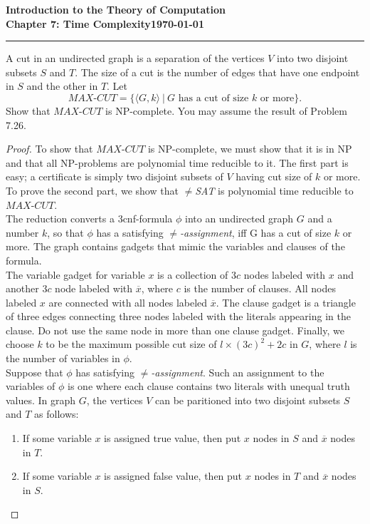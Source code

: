 \documentclass[11pt]{article}
\newcommand{\dated}{\today}
\begin{document}
\textbf{Introduction to the Theory of
Computation}\hfill\textbf{\myname}\\[0.01in]
\textbf{Chapter 7: Time Complexity}\hfill\textbf{\dated}\\
\smallskip\hrule\bigskip

\begin{problem}{7.27}
A cut in an undirected graph is a separation of the vertices $V$ into two disjoint
subsets $S$ and $T$. The size of a cut is the number of edges that have one endpoint
in $S$ and the other in $T$. Let
\[
MAX\text{-}CUT = \{\langle G, k \rangle \ | \ G \text{ has a cut of size } k \text{ or more}\}.
\]
Show that $MAX\text{-}CUT$ is NP-complete. You may assume the result of Problem 7.26.
\end{problem}

\begin{proof}
To show that $MAX\text{-}CUT$ is NP-complete, we must show that it is in NP and that all NP-problems are polynomial time reducible to it. The first part is easy; a certificate is simply two disjoint subsets of $V$ having cut size of $k$ or more. To prove the second part, we show that $\neq$\textit{SAT} is polynomial time reducible to $MAX\text{-}CUT$. \\

The reduction converts a 3cnf-formula $\phi$ into an undirected graph $G$ and
a number $k$, so that $\phi$ has a satisfying $\neq$\textit{-assignment}, iff G has a cut of size $k$ or more. The graph contains gadgets that mimic the variables and clauses of the formula. \\

The variable gadget for variable $x$ is a collection of $3c$ nodes labeled with $x$ and another $3c$ node labeled with $\overline{x}$, where $c$ is the number of clauses. All nodes labeled $x$ are connected with all nodes labeled $\overline{x}$. The clause gadget is a triangle of three edges connecting three nodes labeled with the literals appearing in the clause. Do not use the same node in more than one clause gadget. Finally, we choose $k$ to be the maximum possible cut size of $l \times (3c)^2 + 2c$ in $G$, where $l$ is the number of variables in $\phi$. \\

Suppose that $\phi$ has satisfying $\neq$\textit{-assignment}. Such an assignment to the variables of $\phi$ is one where each clause contains two literals with unequal truth values. In graph $G$, the vertices $V$ can be paritioned into two disjoint subsets $S$ and $T$ as follows:
\begin{enumerate}
\item If some variable $x$ is assigned true value, then put $x$ nodes in $S$ and $\overline{x}$ nodes in $T$.
\item If some variable $x$ is assigned false value, then put $x$ nodes in $T$ and $\overline{x}$ nodes in $S$.
\end{enumerate}


\end{proof}
\end{document}
